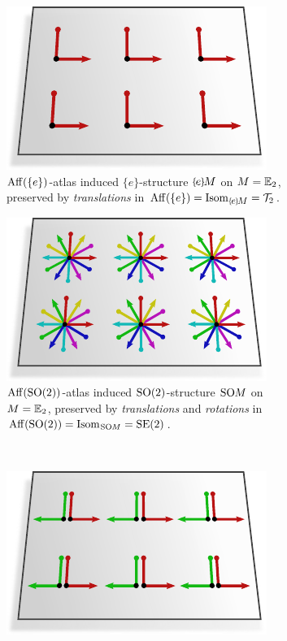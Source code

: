\begin{figure}
    \centering
    \begin{subfigure}[b]{0.46\textwidth}
        \centering
        \includegraphics[width=.7\textwidth]{figures/G_structure_R2_1.pdf}
        \captionsetup{format=hang}
        \caption{\small
            $\operatorname{Aff}(\{e\})$-atlas induced $\{e\}$-structure $\eM$ on ${M=\mathbb{E}_2}$, preserved by \emph{translations} in $\Aff(\{e\}) = \IsomeM = \Trans_2$.
        }
        \label{fig:G_structure_R2_1}
    \end{subfigure}
    \hfill
    \begin{subfigure}[b]{0.46\textwidth}
        \centering
        \includegraphics[width=.7\textwidth]{figures/G_structure_R2_2.pdf}
        \captionsetup{format=hang}
        \caption{\small
            $\operatorname{Aff}(\operatorname{SO}(2))$-atlas induced $\operatorname{SO}(2)$-structure $\operatorname{SO}\mkern-3.6muM$ on $M=\mathbb{E}_2$, preserved by \emph{translations} and \emph{rotations} in $\operatorname{Aff}(\operatorname{SO}(2)) = \operatorname{Isom}_{\mkern1mu\operatorname{SO}\mkern-3.6muM} = \operatorname{SE}(2)$.
        }
        \label{fig:G_structure_R2_2}
    \end{subfigure}
    \\[3ex]
    \begin{subfigure}[b]{0.46\textwidth}
        \centering
        \includegraphics[width=.7\textwidth]{figures/G_structure_R2_3.pdf}

\end{subfigure}
\end{figure}
